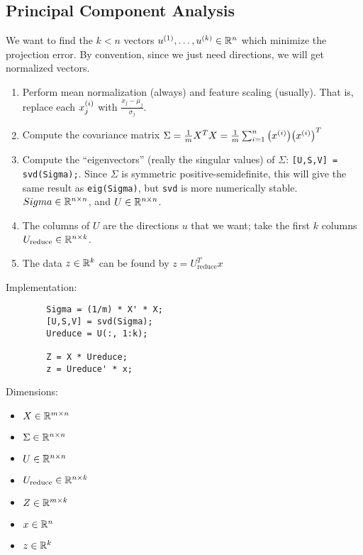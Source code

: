 \subsection{Principal Component Analysis}

We want to find the $k<n$ vectors $u\s{1}, \dots, u\s{k} \in \R^n$
which minimize the projection error.
By convention, since we just need directions, we will get normalized vectors.

\begin{enumerate}
    \item Perform mean normalization (always) and feature scaling (usually).
        That is, replace each $x\ss{j}{i}$ with $\frac{x_j - \mu_j}{\sigma_j}$.
    \item Compute the covariance matrix
        $\Sigma = \frac{1}{m} X^T X = \frac{1}{m} \sum_{i=1}^n \qty(x\s{i})\qty(x\s{i})^T$
    \item Compute the ``eigenvectors'' (really the singular values) of $\Sigma$:
        \texttt{[U,S,V] = svd(Sigma);}.
        Since $\Sigma$ is symmetric positive-semidefinite, this will give
        the same result as \texttt{eig(Sigma)}, but \texttt{svd} is more numerically stable.
        $Sigma \in \R^{n \times n}$, and $U \in \R^{n \times n}$.
    \item The columns of $U$ are the directions $u$ that we want;
        take the first $k$ columns $U_{\text{reduce}} \in \R^{n \times k}$.
    \item The data $z \in \R^k$ can be found by $z = U_{\text{reduce}}^T x$
\end{enumerate}

\begin{minipage}{0.5\textwidth}
    Implementation:
    \begin{lstlisting}[style=Matlab-editor]
        % Principal Component Analysis
        Sigma = (1/m) * X' * X;
        [U,S,V] = svd(Sigma);
        Ureduce = U(:, 1:k);
      
        Z = X * Ureduce;
        z = Ureduce' * x;
    \end{lstlisting}
\end{minipage}\begin{minipage}{0.5\textwidth}
    Dimensions:
    \begin{itemize}
        \item $X \in \R^{m \times n}$
        \item $\Sigma \in \R^{n \times n}$
        \item $U \in \R^{n \times n}$
        \item $U_{\text{reduce}} \in \R^{n \times k}$
        \item $Z \in \R^{m \times k}$
        \item $x \in \R^n$
        \item $z \in \R^k$
    \end{itemize}
\end{minipage}

